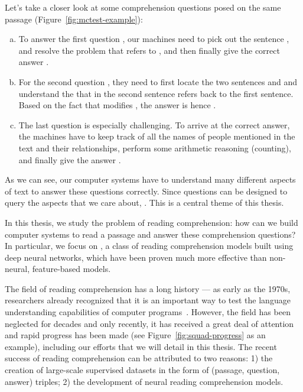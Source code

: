 Let's take a closer look at some comprehension questions posed on the same passage (Figure~\ref{fig:mctest-example}):
\begin{enumerate}[(a)]
    \item
        To answer the first question , our machines need to pick out the sentence , and resolve the  problem that  refers to , and then finally give the correct answer .
    \item
        For the second question , they need to first locate the two sentences  and  and understand the  that  in the second sentence refers back to the first sentence. Based on the fact that  modifies , the answer is hence .
    \item
        The last question is especially challenging. To arrive at the correct answer, the machines have to keep track of all the names of people mentioned in the text and their relationships, perform some arithmetic reasoning (counting), and finally give the answer .
\end{enumerate}

As we can see, our computer systems have to understand many different aspects of text to answer these questions correctly. Since questions can be designed to query the aspects that we care about, . This is a central theme of this thesis.

In this thesis, we study the problem of reading comprehension: how can we build computer systems to read a passage and answer these comprehension questions? In particular, we focus on , a class of reading comprehension models built using deep neural networks, which have been proven much more effective than non-neural, feature-based models.

The field of reading comprehension has a long history --- as early as the 1970s, researchers already recognized that it is an important way to test the language understanding capabilities of computer programs~\cite{lehnert1977process}. However, the field has been neglected for decades and only recently, it has received a great deal of attention and rapid progress has been made (see Figure~\ref{fig:squad-progress} as an example), including our efforts that we will detail in this thesis. The recent success of reading comprehension can be attributed to two reasons: 1) the creation of large-scale supervised datasets in the form of (passage, question, answer) triples; 2) the development of neural reading comprehension models.

